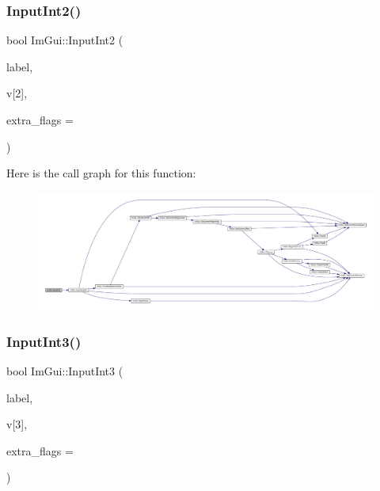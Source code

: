 \subsubsection{\texorpdfstring{Input\+Int2()}{InputInt2()}}
{\footnotesize\ttfamily bool Im\+Gui\+::\+Input\+Int2 (\begin{DoxyParamCaption}\item[{const char $\ast$}]{label,  }\item[{int}]{v\mbox{[}2\mbox{]},  }\item[{\mbox{\hyperlink{imgui_8h_a7d2c6153a6b9b5d3178ce82434ac9fb8}{Im\+Gui\+Input\+Text\+Flags}}}]{extra\+\_\+flags = {} }\end{DoxyParamCaption})}

Here is the call graph for this function\+:
\nopagebreak
\begin{figure}[H]
\begin{center}
\leavevmode
\includegraphics[width=350pt]{namespace_im_gui_a4142cc4545d789d76d51dee61c959a03_cgraph}
\end{center}
\end{figure}
\mbox{\label{namespace_im_gui_ab02fc4a19ed153984d3585296e1c74b1}} 
\subsubsection{\texorpdfstring{Input\+Int3()}{InputInt3()}}
{\footnotesize\ttfamily bool Im\+Gui\+::\+Input\+Int3 (\begin{DoxyParamCaption}\item[{const char $\ast$}]{label,  }\item[{int}]{v\mbox{[}3\mbox{]},  }\item[{\mbox{\hyperlink{imgui_8h_a7d2c6153a6b9b5d3178ce82434ac9fb8}{Im\+Gui\+Input\+Text\+Flags}}}]{extra\+\_\+flags = {} }\end{DoxyParamCaption})}

